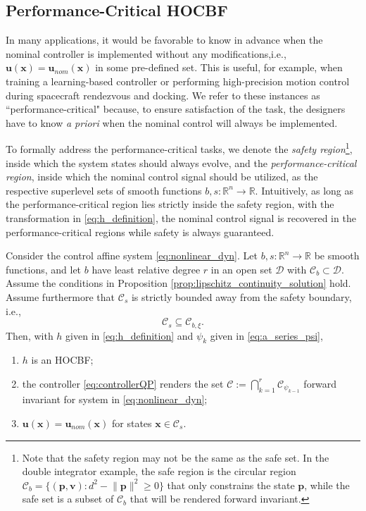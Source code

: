 \documentclass[letterpaper, 10 pt, journal, twoside]{IEEEtran}
\theoremstyle{plain}
\newcommand{\myvar}[1]{\bm{#1}}
\newcommand{\myset}[1]{\mathscr{#1}}
\begin{document}
\subsection{Performance-Critical HOCBF}
In many applications, it would be favorable to know in advance when the nominal controller is implemented without any modifications,i.e., $\myvar{u}(\myvar{x}) = \myvar{u}_{nom}(\myvar{x})$ in some pre-defined set. This is useful, for example, when training a learning-based controller {or performing high-precision motion control during spacecraft rendezvous and docking}. We refer to these instances as ``performance-critical" because, to ensure satisfaction of the task, the designers have to know \textit{a priori} when the nominal control will always be implemented. 

To formally address the performance-critical tasks, we denote the \textit{safety region}\footnote{Note that the safety region may not be the same as the safe set. In the double integrator example, the safe region is the circular region $\myset{C}_{b} = \{ (\myvar{p},\myvar{v}): d^2 - \lVert \myvar{p} \rVert^2 \ge 0  \}  $ that only constrains the state $\myvar{p}$, while the safe set is a subset of $\myset{C}_{b}$ that will be rendered forward invariant.}, inside which the system states should always evolve, and the \textit{performance-critical region}, inside which the nominal control signal should be utilized, as the respective superlevel sets of smooth functions $b, s:\mathbb{R}^n \to \mathbb{R} $. Intuitively, as long as the  performance-critical region lies strictly inside the safety region, with the transformation in \eqref{eq:h_definition},  the nominal control signal is recovered in the performance-critical regions  while safety is always guaranteed. 



\begin{thm} \label{thm:nominal_control_recovered}
Consider the control affine system \eqref{eq:nonlinear_dyn}. Let $b,s: \mathbb{R}^n \to \mathbb{R}$ be smooth functions, and let $b$  have least relative degree $r$ in an open set $\myset{D}$ with $\myset{C}_b \subset \myset{D}$. Assume  the conditions in Proposition \ref{prop:lipschitz_continuity_solution}  hold. Assume furthermore that  $\myset{C}_s$ is strictly bounded away from the safety boundary, i.e.,
\begin{equation}
    \myset{C}_s \subseteq \myset{C}_{b,\xi}.
\end{equation}
 Then,  with $h$ given in \eqref{eq:h_definition} and $\psi_{k}$ given in \eqref{eq:a_series_psi},
 \begin{enumerate}
     \item  $h$ is an HOCBF;
     \item  the controller \eqref{eq:controllerQP} renders the set $\myset{C}:= \bigcap_{k =1}^{r}  \myset{C}_{\psi_{k-1}} $ forward invariant for system in \eqref{eq:nonlinear_dyn};
     \item  $\myvar{u}(\myvar{x}) = \myvar{u}_{nom}(\myvar{x})$ for states $\myvar{x}\in  \myset{C}_{s}$.
 \end{enumerate}
\end{thm}
\end{document}
